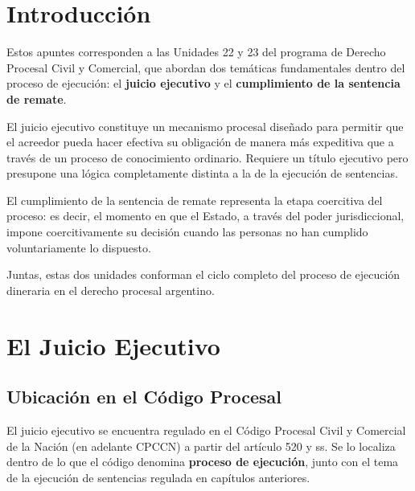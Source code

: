 \documentclass[12pt,oneside]{book}
\begin{document}

\tableofcontents


\chapter*{Introducción}

Estos apuntes corresponden a las Unidades 22 y 23 del programa de Derecho Procesal Civil y Comercial, que abordan dos temáticas fundamentales dentro del proceso de ejecución: el \textbf{juicio ejecutivo} y el \textbf{cumplimiento de la sentencia de remate}.

El juicio ejecutivo constituye un mecanismo procesal diseñado para permitir que el acreedor pueda hacer efectiva su obligación de manera más expeditiva que a través de un proceso de conocimiento ordinario. Requiere un título ejecutivo pero presupone una lógica completamente distinta a la de la ejecución de sentencias.

El cumplimiento de la sentencia de remate representa la etapa coercitiva del proceso: es decir, el momento en que el Estado, a través del poder jurisdiccional, impone coercitivamente su decisión cuando las personas no han cumplido voluntariamente lo dispuesto.

Juntas, estas dos unidades conforman el ciclo completo del proceso de ejecución dineraria en el derecho procesal argentino.


\chapter{El Juicio Ejecutivo}

\section{Ubicación en el Código Procesal}

El juicio ejecutivo se encuentra regulado en el Código Procesal Civil y Comercial de la Nación (en adelante CPCCN) a partir del artículo 520 y ss. Se lo localiza dentro de lo que el código denomina \textbf{proceso de ejecución}, junto con el tema de la ejecución de sentencias regulada en capítulos anteriores.
\end{document}
